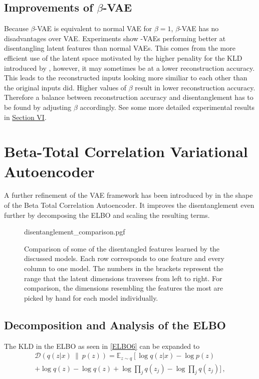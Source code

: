 \documentclass[a4paper]{IEEEtran}
\begin{document}
{\subsection{Improvements of $\beta$-VAE}
Because $\beta$-VAE is equivalent to normal VAE for $\beta = 1$, $\beta$-VAE has no disadvantages over VAE. Experiments show \textbeta -VAEs performing better at disentangling latent features than normal VAEs. This comes from the more efficient use of the latent space motivated by the higher penality for the KLD introduced by \textbeta, however, it may sometimes be at a lower reconstruction accuracy. This leads to the reconstructed inputs looking more similiar to each other than the original inputs did. Higher values of $\beta$ result in lower reconstruction accuracy. Therefore a balance between reconstruction accuracy and disentanglement has to be found by adjusting $\beta$ accordingly. See some more detailed experimental results in \hyperref[sec:experiments]{Section VI}.


\section{Beta-Total Correlation Variational Autoencoder}
A further refinement of the VAE framework has been introduced by \cite{chen2019isolating} in the shape of the Beta Total Correlation Autoencoder. It improves the disentanglement even further by decomposing the ELBO and scaling the resulting terms.

\begin{figure*}[h]
	\centering
    {disentanglement_comparison.pgf}
    \caption{Comparison of some of the disentangled features learned by the discussed models. Each row corresponds to one feature and every column to one model. The numbers in the brackets represent the range that the latent dimensions traverses from left to right. For comparison, the dimensions resembling the features the most are picked by hand for each model individually.}
    \label{fig:disentanglement}
\end{figure*}

\subsection{Decomposition and Analysis of the ELBO}
The KLD in the ELBO as seen in \eqref{ELBO6} can be expanded to
\begin{align*}
\mathcal{D}(q(z|x) \ \| \ p(z)) =
	\mathbb{E}_{z \sim q} \left[ \log q(z|x) - \log p(z) \right. \\
	 + \log q(z) - \log q(z) + \log \prod_j q(z_j) - \log \prod_j q(z_j) ]\,,
\end{align*}

}
\end{document}
